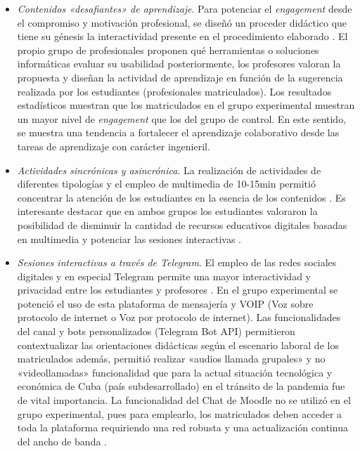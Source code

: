 \documentclass[spanish]{textolivre}
\begin{document}
\begin{itemize}
    \item \emph{Contenidos «desafiantes» de aprendizaje}. Para potenciar el \emph{engagement} desde el compromiso y motivación profesional, se diseñó un proceder didáctico que tiene su génesis la interactividad presente en el procedimiento elaborado . El propio grupo de profesionales proponen qué herramientas o soluciones informáticas evaluar su usabilidad  posteriormente, los profesores valoran la propuesta y diseñan la actividad de aprendizaje en función de la sugerencia realizada por los estudiantes (profesionales matriculados). Los resultados estadísticos muestran que los matriculados en el grupo experimental muestran un mayor nivel de \emph{engagement} que los del grupo de control. En este sentido, se muestra una tendencia a fortalecer el aprendizaje colaborativo \cite{cavinato2021} %
    desde las tareas de aprendizaje con carácter ingenieril.

    \item \emph{Actividades sincrónicas y asincrónica}.  La realización de actividades de diferentes tipologías y el empleo de multimedia de 10-15min permitió concentrar la atención de los estudiantes en la esencia de los contenidos \cite{cavinato2021}. %
    Es interesante destacar que en ambos grupos los estudiantes valoraron la posibilidad de disminuir la cantidad de recursos educativos digitales basadas en multimedia y potenciar las sesiones interactivas \cite{alexander2018, kerimbayev2020, snyder2020, sim2021, walker2021, smith2021}. %
    
    \item \emph{Sesiones interactivas a través de Telegram}. El empleo de las redes sociales digitales y en especial Telegram permite una mayor interactividad y privacidad entre los estudiantes y profesores \cite{gazcaherrera2020, paredes2020, fuentescancell2021}. %
    En el grupo experimental se potenció el uso de esta plataforma de mensajería y VOIP (Voz sobre protocolo de internet o Voz por protocolo de internet). Las funcionalidades del canal y bots personalizados (Telegram Bot API) permitieron contextualizar las orientaciones didácticas según el escenario laboral de los matriculados además, permitió realizar «audios llamada grupales» y no «videollamadas» funcionalidad que para la actual situación tecnológica y económica de Cuba (país subdesarrollado) en el tránsito de la pandemia fue de vital importancia. La funcionalidad del Chat de Moodle no se utilizó en el grupo experimental, pues para emplearlo, los matriculados deben acceder a toda la plataforma requiriendo una red robusta y una actualización continua del ancho de banda \cite {maphosa2020}. %
\end{itemize} 
\end{document}
